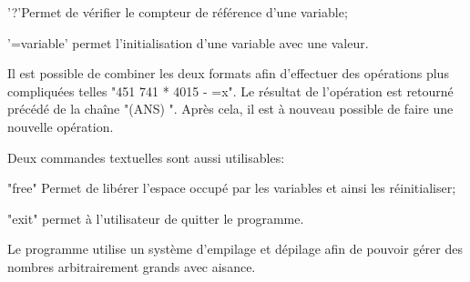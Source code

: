 \documentclass[]{report}
\begin{document}
\begin{normalsize}
		\begin{description}[noitemsep]
			\item \hspace{4mm}'?'Permet de vérifier le compteur de référence d'une variable;
			\item \hspace{4mm}'=variable' permet l'initialisation d'une variable avec une valeur.
		\end{description}
		\par Il est possible de combiner les deux formats afin d'effectuer des opérations plus compliquées telles "451 741 * 4015 - =x". Le résultat de l'opération est retourné précédé de la chaîne "(ANS) ". Après cela, il est à nouveau possible de faire une nouvelle opération.
		\vspace{4mm}
		\par Deux commandes textuelles sont aussi utilisables:
		\begin{description}[noitemsep]
			\item \hspace{4mm}"free" Permet de libérer l'espace occupé par les variables et ainsi les réinitialiser;
			\item \hspace{4mm}"exit" permet à l'utilisateur de quitter le programme.
		\end{description}
	\par Le programme utilise un système d'empilage et dépilage afin de pouvoir gérer des nombres arbitrairement grands avec aisance.
		\vspace{4mm}
	\end{normalsize}
	\newpage
\end{document}
